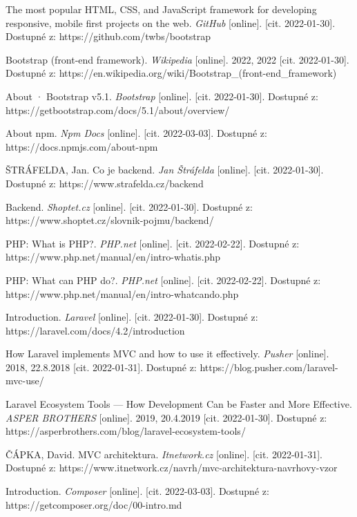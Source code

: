 \begin{thebibliography}{50}
The most popular HTML, CSS, and JavaScript framework for developing responsive, mobile first projects on the web. \textit{GitHub} [online]. [cit. 2022-01-30]. Dostupné z: https://github.com/twbs/bootstrap

Bootstrap (front-end framework). \textit{Wikipedia} [online]. 2022, 2022 [cit. 2022-01-30]. Dostupné z: https://en.wikipedia.org/wiki/Bootstrap\_(front-end\_framework)

About · Bootstrap v5.1. \textit{Bootstrap} [online]. [cit. 2022-01-30]. Dostupné z: https://getbootstrap.com/docs/5.1/about/overview/

About npm. \textit{Npm Docs} [online]. [cit. 2022-03-03]. Dostupné z: https://docs.npmjs.com/about-npm

ŠTRÁFELDA, Jan. Co je backend. \textit{Jan Štráfelda} [online]. [cit. 2022-01-30]. Dostupné z: https://www.strafelda.cz/backend

Backend. \textit{Shoptet.cz} [online]. [cit. 2022-01-30]. Dostupné z: https://www.shoptet.cz/slovnik-pojmu/backend/

PHP: What is PHP?. \textit{PHP.net} [online]. [cit. 2022-02-22]. Dostupné z: https://www.php.net/manual/en/intro-whatis.php

PHP: What can PHP do?. \textit{PHP.net} [online]. [cit. 2022-02-22]. Dostupné z: https://www.php.net/manual/en/intro-whatcando.php

Introduction. \textit{Laravel} [online]. [cit. 2022-01-30]. Dostupné z: https://laravel.com/docs/4.2/introduction

How Laravel implements MVC and how to use it effectively. \textit{Pusher} [online]. 2018, 22.8.2018 [cit. 2022-01-31]. Dostupné z: https://blog.pusher.com/laravel-mvc-use/

Laravel Ecosystem Tools --- How Development Can be Faster and More Effective. \textit{ASPER BROTHERS} [online]. 2019, 20.4.2019 [cit. 2022-01-30]. Dostupné z: https://asperbrothers.com/blog/laravel-ecosystem-tools/

ČÁPKA, David. MVC architektura. \textit{Itnetwork.cz} [online]. [cit. 2022-01-31]. Dostupné z: https://www.itnetwork.cz/navrh/mvc-architektura-navrhovy-vzor

Introduction. \textit{Composer} [online]. [cit. 2022-03-03]. Dostupné z: https://getcomposer.org/doc/00-intro.md


\end{thebibliography}
